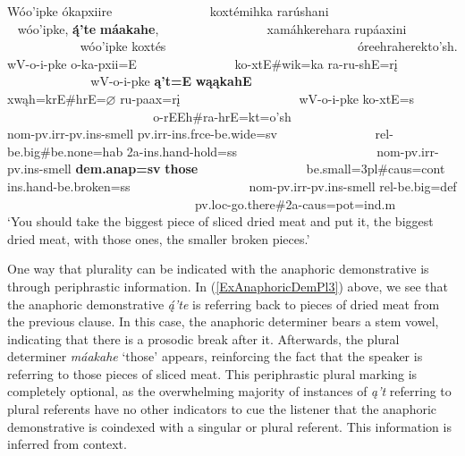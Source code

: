 \begin{exe}
\begin{xlist}
\item\label{ExAnaphoricDemPl3} \glll Wóo'ipke ókapxiire ~ ~ ~ ~ ~ ~ ~ ~ ~  koxtémihka rarúshani ~ ~ ~ ~ ~ ~ ~ ~ ~ ~ ~ ~ ~  wóo'ipke, \textbf{ą́'te} \textbf{máakahe}, ~ ~ ~ ~ ~ ~ ~ ~ ~ ~ xamáhkerehara rupáaxini ~ ~ ~ ~ ~ ~ ~ ~ ~ ~ ~ wóo'ipke koxtés ~ ~ ~ ~ ~ ~ ~ ~ ~ ~ ~ ~ ~ ~ ~ ~ ~ ~ óreehraherekto'sh.\\
    wV-o-i-pke o-ka-pxii=E ~ ~ ~ ~ ~ ~ ~ ~ ~ ko-xtE\#wik=ka ra-ru-shE=rį ~ ~ ~ ~ ~ ~ ~ ~ ~ ~ ~ ~ ~  wV-o-i-pke \textbf{ą't=E} \textbf{wąąkahE} ~ ~ ~ ~ ~ ~ ~ ~ ~ ~ xwąh=krE\#hrE=$\varnothing$ ru-paax=rį ~ ~ ~ ~ ~ ~ ~ ~ ~ ~ ~  wV-o-i-pke ko-xtE=s ~ ~ ~ ~ ~ ~ ~ ~ ~ ~ ~ ~ ~ ~ ~ ~ ~ ~ o-rEEh\#ra-hrE=kt=o'sh\\
    nom-pv.irr-pv.ins-\textnormal{smell} pv.irr-ins.frce-\textnormal{be.wide}=sv ~ ~ ~ ~ ~ ~ ~ ~ ~ rel-\textnormal{be.big}\#\textnormal{be.none}=hab 2a-ins.hand-\textnormal{hold}=ss ~ ~ ~ ~ ~ ~ ~ ~ ~ ~ ~ ~ ~  nom-pv.irr-pv.ins-\textnormal{smell} \textbf{dem.anap=sv} {\bfseries\textnormal{those}} ~ ~ ~ ~ ~ ~ ~ ~ ~ ~ \textnormal{be.small}=3pl\#caus=cont ins.hand-\textnormal{be.broken}=ss ~ ~ ~ ~ ~ ~ ~ ~ ~ ~ ~  nom-pv.irr-pv.ins-\textnormal{smell} rel-\textnormal{be.big}=def  ~ ~ ~ ~ ~ ~ ~ ~ ~ ~ ~ ~ ~ ~ ~ ~ ~ ~ pv.loc-\textnormal{go.there}\#2a-caus=pot=ind.m\\
    \glt `You should take the biggest piece of sliced dried meat and put it, the biggest dried meat, with those ones, the smaller broken pieces.' \citep[223]{hollow1973b}

\end{xlist}

\end{exe}

One way that plurality can be indicated with the anaphoric demonstrative is through periphrastic information. In (\ref{ExAnaphoricDemPl3}) above, we see that the anaphoric demonstrative \textit{ą́'te} is referring back to pieces of dried meat from the previous clause. In this case, the anaphoric determiner bears a stem vowel, indicating that there is a prosodic break after it. Afterwards, the plural determiner \textit{máakahe} `those' appears, reinforcing the fact that the speaker is referring to those pieces of sliced meat. This periphrastic plural marking is completely optional, as the overwhelming majority of instances of \textit{ą't} referring to plural referents have no other indicators to cue the listener that the anaphoric demonstrative is coindexed with a singular or plural referent. This information is inferred from context.

